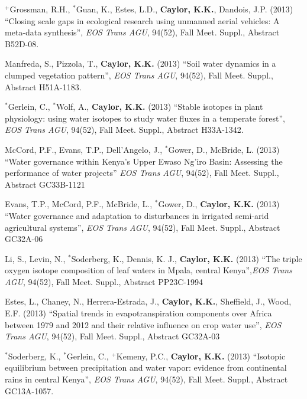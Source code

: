 \documentclass[10pt]{article}
\begin{document}
\begin{etaremune}
\item $^{+}$Grossman, R.H., $^{*}$Guan, K.,  Estes, L.D., \textbf{Caylor, K.K.}, Dandois, J.P. (2013) ``Closing scale gaps in ecological research using unmanned aerial vehicles: A meta-data synthesis'', \emph{EOS Trans AGU}, 94(52), Fall Meet. Suppl., Abstract B52D-08.  

\item Manfreda, S., Pizzola, T., \textbf{Caylor, K.K.} (2013) ``Soil water dynamics in a clumped vegetation pattern'', \emph{EOS Trans AGU}, 94(52), Fall Meet. Suppl., Abstract H51A-1183.

\item $^{*}$Gerlein, C., $^{*}$Wolf, A., \textbf{Caylor, K.K.} (2013) ``Stable isotopes in plant physiology: using water isotopes to study water fluxes in a temperate forest'', \emph{EOS Trans AGU}, 94(52), Fall Meet. Suppl., Abstract H33A-1342.

\item McCord, P.F., Evans, T.P., Dell'Angelo, J., $^{*}$Gower, D., McBride, L. (2013) ``Water governance within Kenya's Upper Ewaso Ng'iro Basin: Assessing the performance of water projects'' \emph{EOS Trans AGU}, 94(52), Fall Meet. Suppl., Abstract GC33B-1121

\item Evans, T.P., McCord, P.F., McBride, L., $^{*}$Gower, D., \textbf{Caylor, K.K.} (2013) ``Water governance and adaptation to disturbances in irrigated semi-arid agricultural systems'', \emph{EOS Trans AGU}, 94(52), Fall Meet. Suppl., Abstract GC32A-06

\item Li, S., Levin, N., $^{*}$Soderberg, K., Dennis, K. J., \textbf{Caylor, K.K.} (2013) ``The triple oxygen isotope composition of leaf waters in Mpala, central Kenya'',\emph{EOS Trans AGU}, 94(52), Fall Meet. Suppl., Abstract PP23C-1994

\item Estes, L., Chaney, N., Herrera-Estrada, J., \textbf{Caylor, K.K.}, Sheffield, J., Wood, E.F. (2013) ``Spatial trends in evapotranspiration components over Africa between 1979 and 2012 and their relative influence on crop water use'', \emph{EOS Trans AGU}, 94(52), Fall Meet. Suppl., Abstract GC32A-03

\item $^{*}$Soderberg, K., $^{*}$Gerlein, C., $^{+}$Kemeny, P.C., \textbf{Caylor, K.K.} (2013) ``Isotopic equilibrium between precipitation and water vapor: evidence from continental rains in central Kenya'', \emph{EOS Trans AGU}, 94(52), Fall Meet. Suppl., Abstract GC13A-1057.


\end{etaremune}
\end{document}

